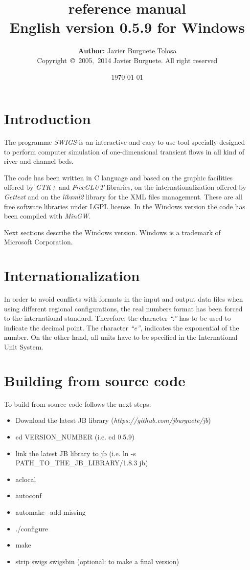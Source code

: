 \documentclass[a4paper,12pt]{article}
\title
{
	{\bf\Large {\swigs} reference manual}\\
	{\large	English version 0.5.9 for Windows}
}
\author
{
	{\bf Author:} Javier Burguete Tolosa\\
	{\small Copyright~\copyright~2005,~2014 Javier Burguete.
	All right reserved}
}
\date{\today}
\newcommand{\swigs}{\emph{SWIGS}}
\newcommand{\IT}[1]{{\sl ``#1''}}
\begin{document}
\maketitle

\tableofcontents
\clearpage

\setlength{\parskip}{\baselineskip / 2}

\section{Introduction}

The programme {\swigs} is an interactive and easy-to-use tool specially designed
to perform computer simulation of one-dimensional transient flows in all kind of
river and channel beds. 

The code has been written in C language and based on the graphic facilities
offered by \emph{GTK+} and \emph{FreeGLUT} libraries, on the
internationalization offered by \emph{Gettext} and on the \emph{libxml2} library
for the XML files management. These are all free software libraries under LGPL
license. In the Windows version the code has been compiled with \emph{MinGW}.

Next sections describe the Windows version. Windows is a trademark of Microsoft
Corporation.

\section{Internationalization}

In order to avoid conflicts with formats in the input and output data files when
using different regional configurations, the real numbers format has been forced
to the international standard. Therefore, the character \IT{.} has to be used to
indicate the decimal point. The character \IT{e}, indicates the exponential of
the number. On the other hand, all units have to be specified in the
International Unit System. 

\section{Building from source code}

To build from source code follows the next steps:
\begin{itemize}
	\item Download the latest JB library
		(\emph{https://github.com/jburguete/jb})
	\item cd VERSION\_NUMBER (i.e. cd 0.5.9)
	\item link the latest JB library to jb (i.e. ln -s
		PATH\_TO\_THE\_JB\_LIBRARY/1.8.3 jb)
	\item aclocal
	\item autoconf
	\item automake --add-missing
	\item ./configure
	\item make
	\item strip swigs swigsbin (optional: to make a final version)
\end{itemize}
\end{document}
